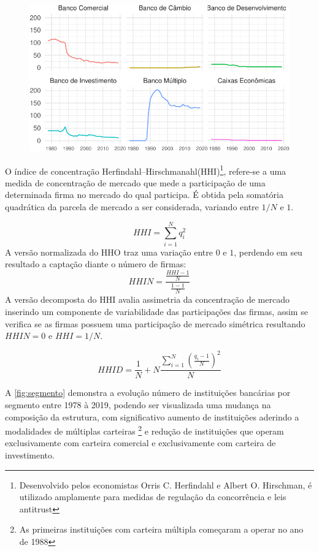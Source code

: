 \documentclass[12pt,openright,oneside,a4paper,chapter=TITLE,section=TITLE,subsection=TITLE,english,french,spanish,portugues,sumario=tradicional]{abntex2}
\begin{document}
\begin{figure}

\begin{center}\includegraphics{12-exportedfigures/bank evolution-1} \end{center}
\label{fig:segmento}
\end{figure}

O índice de concentração Herfindahl--Hirschmanahl(HHI)\footnote{Desenvolvido pelos economistas Orris C. Herfindahl e Albert O. Hirschman, é utilizado amplamente para medidas de regulação da concorrência e leis antitrust}, refere-se a uma medida de concentração de mercado que mede a participação de uma determinada firma no mercado do qual participa. É obtida pela somatória quadrática da parcela de mercado a ser considerada, variando entre \(1/N\) e \(1\).

\[
HHI = \sum_{i=1}^{N}q_i^2
\]
A versão normalizada do HHO traz uma variação entre \(0\) e \(1\), perdendo em seu resultado a captação diante o número de firmas:
\[
HHIN = \frac{\frac{HHI - 1}{N}}{\frac{1-1}{N}}
\]
A versão decomposta do HHI avalia assimetria da concentração de mercado inserindo um componente de variabilidade das participações das firmas, assim se verifica se as firmas possuem uma participação de mercado simétrica resultando \(HHIN = 0\) e \(HHI= 1/N\).

\[
HHID = \frac{1}{N} + N\frac{\sum_{i=1}^{N}(\frac{q_i - 1}{N})^2}{N}
\]

A \autoref{fig:segmento} demonstra a evolução número de instituições bancárias
por segmento entre 1978 à 2019, podendo ser visualizada uma mudança na
composição da estrutura, com significativo aumento de instituições aderindo a
modalidades de múltiplas carteiras \footnote{As primeiras instituições com
carteira múltipla começaram a operar no ano de 1988} e redução de instituições que operam exclusivamente com carteira comercial e exclusivamente com carteira
de investimento.
\end{document}
